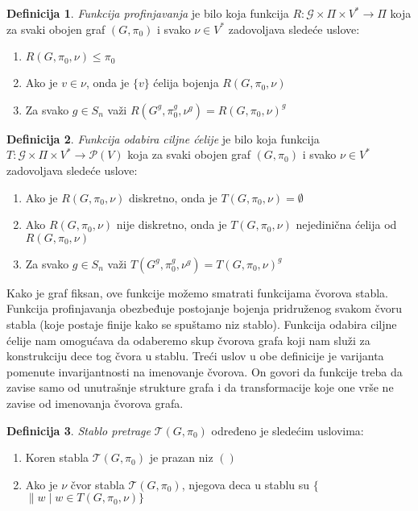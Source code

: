 \documentclass[12pt,oneside]{memoir}
\theoremstyle{definition} \newtheorem*{definition}{Definicija}
\begin{document}
 \begin{definition}
  \emph{Funkcija profinjavanja} je bilo koja funkcija $R : \mathcal{G} \times
	 \Pi \times V^* \to \Pi$ koja za svaki obojen graf $(G, \pi_0)$ i svako
	 $\nu \in V^*$ zadovoljava sledeće uslove:
 
  \begin{enumerate}
     \item $R(G, \pi_0, \nu) \leq \pi_0$
     \item Ako je $v \in \nu$, onda je $\{v\}$ ćelija bojenja $R(G, \pi_0, \nu)$
     \item Za svako $g \in S_n$ važi $R(G^g, \pi_0^g, \nu^g) = R(G, \pi_0, \nu)^g$
  \end{enumerate}
 \end{definition}

 \begin{definition}
  \emph{Funkcija odabira ciljne ćelije} je bilo koja funkcija $T : \mathcal{G}
	 \times \Pi \times V^* \to \mathcal{P}(V)$ koja za svaki obojen graf $(G,
	 \pi_0)$ i svako $\nu \in V^*$ zadovoljava sledeće uslove:
 
  \begin{enumerate}
	  \item Ako je $R(G, \pi_0, \nu)$ diskretno, onda je $T(G, \pi_0, \nu) = \emptyset$
	  \item Ako $R(G, \pi_0, \nu)$ nije diskretno, onda je $T(G, \pi_0, \nu)$ nejedinična ćelija od $R(G, \pi_0, \nu)$
     \item Za svako $g \in S_n$ važi $T(G^g, \pi_0^g, \nu^g) = T(G, \pi_0, \nu)^g$
  \end{enumerate}
 \end{definition}

 Kako je graf fiksan, ove funkcije možemo smatrati funkcijama čvorova stabla.
 Funkcija profinjavanja obezbeđuje postojanje bojenja pridruženog svakom čvoru
 stabla (koje postaje finije kako se spuštamo niz stablo). Funkcija odabira
 ciljne ćelije nam omogućava da odaberemo skup čvorova grafa koji nam služi za
 konstrukciju dece tog čvora u stablu. Treći uslov u obe definicije je
 varijanta pomenute invarijantnosti na imenovanje čvorova. On govori da
 funkcije treba da zavise samo od unutrašnje strukture grafa i da
 transformacije koje one vrše ne zavise od imenovanja čvorova grafa.

 \begin{definition}
	 \emph{Stablo pretrage} $\mathcal{T}(G, \pi_0)$ određeno je sledećim uslovima:
 
  \begin{enumerate}
    \item Koren stabla $\mathcal{T}(G, \pi_0)$ je prazan niz $()$
	\item Ako je $\nu$ čvor stabla $\mathcal{T}(G, \pi_0)$, njegova deca u stablu su $\{$\nu$ \| w \mid w \in T(G, \pi_0, \nu)\}$
  \end{enumerate}
 \end{definition}
\end{document}
